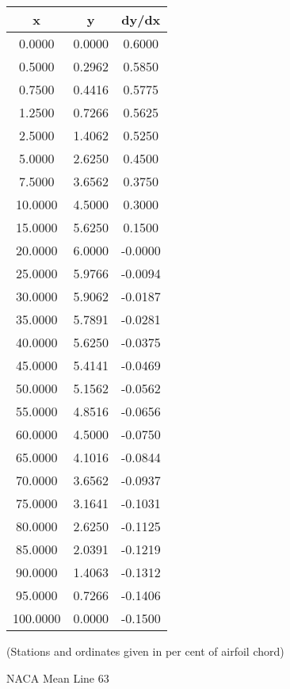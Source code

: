 \documentclass[11pt]{book}
\begin{document}
 \vspace{8mm}
 \begin{tabular}{|c|c|c|}  \hline
 x & y & dy/dx \\
 \hline
0.0000 & 0.0000 & 0.6000 \\
0.5000 & 0.2962 & 0.5850 \\
0.7500 & 0.4416 & 0.5775 \\
1.2500 & 0.7266 & 0.5625 \\
2.5000 & 1.4062 & 0.5250 \\
5.0000 & 2.6250 & 0.4500 \\
7.5000 & 3.6562 & 0.3750 \\
10.0000 & 4.5000 & 0.3000 \\
15.0000 & 5.6250 & 0.1500 \\
20.0000 & 6.0000 & -0.0000 \\
25.0000 & 5.9766 & -0.0094 \\
30.0000 & 5.9062 & -0.0187 \\
35.0000 & 5.7891 & -0.0281 \\
40.0000 & 5.6250 & -0.0375 \\
45.0000 & 5.4141 & -0.0469 \\
50.0000 & 5.1562 & -0.0562 \\
55.0000 & 4.8516 & -0.0656 \\
60.0000 & 4.5000 & -0.0750 \\
65.0000 & 4.1016 & -0.0844 \\
70.0000 & 3.6562 & -0.0937 \\
75.0000 & 3.1641 & -0.1031 \\
80.0000 & 2.6250 & -0.1125 \\
85.0000 & 2.0391 & -0.1219 \\
90.0000 & 1.4063 & -0.1312 \\
95.0000 & 0.7266 & -0.1406 \\
100.0000 & 0.0000 & -0.1500 \\
 \hline
 \end{tabular}
 \vspace{8mm}

(Stations and ordinates given in per cent of airfoil chord)

 \newpage
 \label{ml63}
 \begin{Large}
 NACA Mean Line 63
 \end{Large}
  
\end{document}
